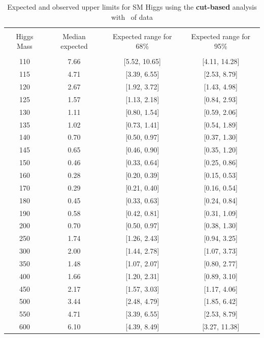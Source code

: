 \begin{table}[hbp!]
\begin{center}
\begin{tabular}{c c c c}
\hline
\vspace{-3mm} && \\
 Higgs Mass   & Median expected & Expected range for 68\% & Expected range for 95\%   \\
\vspace{-3mm} && \\
\hline
110 &  7.66 & [5.52, 10.65] & [4.11, 14.28] \\
115 &  4.71 & [3.39, 6.55] & [2.53, 8.79] \\
120 &  2.67 & [1.92, 3.72] & [1.43, 4.98] \\
125 &  1.57 & [1.13, 2.18] & [0.84, 2.93] \\
130 &  1.11 & [0.80, 1.54] & [0.59, 2.06] \\
135 &  1.02 & [0.73, 1.41] & [0.54, 1.89] \\
140 &  0.70 & [0.50, 0.97] & [0.37, 1.30] \\
145 &  0.65 & [0.46, 0.90] & [0.35, 1.20] \\
150 &  0.46 & [0.33, 0.64] & [0.25, 0.86] \\
160 &  0.28 & [0.20, 0.39] & [0.15, 0.53] \\
170 &  0.29 & [0.21, 0.40] & [0.16, 0.54] \\
180 &  0.45 & [0.33, 0.63] & [0.24, 0.84] \\
190 &  0.58 & [0.42, 0.81] & [0.31, 1.09] \\
200 &  0.70 & [0.50, 0.97] & [0.38, 1.30] \\
250 &  1.74 & [1.26, 2.43] & [0.94, 3.25] \\
300 &  2.00 & [1.44, 2.78] & [1.07, 3.73] \\
350 &  1.48 & [1.07, 2.07] & [0.80, 2.77] \\
400 &  1.66 & [1.20, 2.31] & [0.89, 3.10] \\
450 &  2.17 & [1.57, 3.03] & [1.17, 4.06] \\
500 &  3.44 & [2.48, 4.79] & [1.85, 6.42] \\
550 &  4.71 & [3.39, 6.55] & [2.53, 8.79] \\
600 &  6.10 & [4.39, 8.49] & [3.27, 11.38] \\
\hline
\end{tabular}
\caption{Expected and observed upper limits for SM Higgs using the
  {\bf cut-based} analysis with \intlumiEightTeV\ of data}
\label{tab:cutbase_uls}
\end{center}
\end{table}

